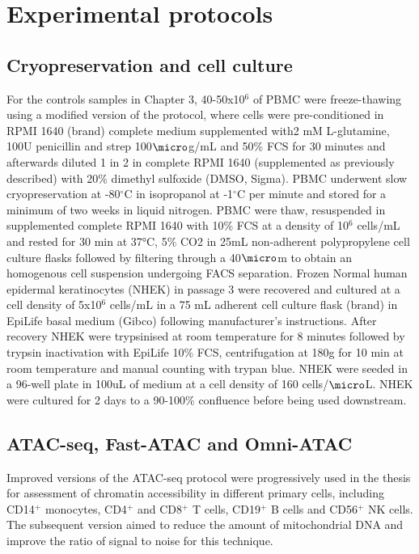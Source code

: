 \section{Experimental protocols}
\subsection{Cryopreservation and cell culture}
For the controls samples in Chapter 3, 40-50x10$^6$ of PBMC were freeze-thawing using a modified version of the \parencite{Kent2009} protocol, where cells were pre-conditioned in RPMI 1640 (brand) complete medium supplemented with2 mM L-glutamine, 100U penicillin and strep 100$\micro$g/mL and 50\% FCS for 30 minutes and afterwards diluted 1 in 2 in complete RPMI 1640 (supplemented as previously described) with 20\% dimethyl sulfoxide (DMSO, Sigma). PBMC underwent slow cryopreservation at -80{$^\circ$}C in isopropanol at -1{$^\circ$}C per minute and stored for a minimum of two weeks in liquid nitrogen. PBMC were thaw, resuspended in supplemented complete RPMI 1640 with 10\% FCS at a density of 10$^6$ cells/mL and rested for 30 min at 37°C, 5\% CO2 in 25mL non-adherent polypropylene cell culture flasks followed by filtering through a 40$\micro$m to obtain an homogenous cell suspension undergoing FACS separation.
%
Frozen Normal human epidermal keratinocytes (NHEK) in passage 3 were recovered and cultured at a cell density of 5x10$^6$ cells/mL in a 75 mL adherent cell culture flask (brand) in EpiLife basal medium (Gibco) following manufacturer's instructions. After recovery NHEK were trypsinised at room temperature for 8 minutes followed by trypsin inactivation with EpiLife 10\% FCS, centrifugation at 180g for 10 min at room temperature and manual counting with trypan blue. NHEK were seeded in a 96-well plate in 100uL of medium at a cell density of 160 cells/$\micro$L. NHEK were cultured for 2 days to a 90-100\% confluence before being used downstream.

\subsection{ATAC-seq, Fast-ATAC and Omni-ATAC}
Improved versions of the ATAC-seq protocol were progressively used in the thesis for assessment of chromatin accessibility in different primary cells, including CD14$^{+}$ monocytes, CD4$^+$ and CD8$^+$ T cells, CD19$^+$ B cells and CD56$^+$ NK cells. The subsequent version aimed to reduce the amount of mitochondrial DNA and improve the ratio of signal to noise for this technique.

